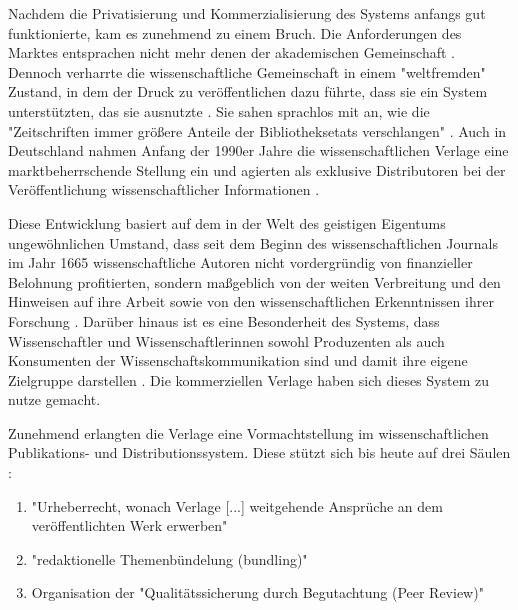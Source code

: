 Nachdem die Privatisierung und Kommerzialisierung des Systems anfangs gut funktionierte, kam es zunehmend zu einem Bruch. Die Anforderungen des Marktes entsprachen nicht mehr denen der akademischen Gemeinschaft \cite{Weiner_2001}. Dennoch verharrte die wissenschaftliche Gemeinschaft in einem "weltfremden" Zustand, in dem der Druck zu veröffentlichen dazu führte, dass sie ein System unterstützten, das sie ausnutzte \cite{Weiner_2001}. Sie sahen sprachlos mit an, wie die "Zeitschriften immer größere Anteile der Bibliotheksetats verschlangen" \cite{Hagner_2015}. Auch in Deutschland nahmen Anfang der 1990er Jahre die wissenschaftlichen Verlage eine marktbeherrschende Stellung ein und agierten als exklusive Distributoren bei der Veröffentlichung wissenschaftlicher Informationen \cite{Schloegl_2005} \cite{Offhaus_2012}.

Diese Entwicklung basiert auf dem in der Welt des geistigen Eigentums ungewöhnlichen Umstand, dass seit dem Beginn des wissenschaftlichen Journals im Jahr 1665 wissenschaftliche Autoren nicht vordergründig von finanzieller Belohnung profitierten, sondern maßgeblich von der weiten Verbreitung und den Hinweisen auf ihre Arbeit sowie von den wissenschaftlichen Erkenntnissen ihrer Forschung \cite{Albert_2006}. Darüber hinaus ist es eine Besonderheit des Systems, dass Wissenschaftler und Wissenschaftlerinnen sowohl Produzenten als auch Konsumenten der Wissenschaftskommunikation sind und damit ihre eigene Zielgruppe darstellen \cite{Hess_2006}. Die kommerziellen Verlage haben sich dieses System zu nutze gemacht.

Zunehmend erlangten die Verlage eine Vormachtstellung im wissenschaftlichen Publikations- und Distributionssystem. Diese stützt sich bis heute auf drei Säulen \cite{Offhaus_2012} \cite[:177]{Bargheer_2006}:
\begin{enumerate}
\item "Urheberrecht, wonach Verlage [...] weitgehende Ansprüche an dem veröffentlichten Werk erwerben"
\item "redaktionelle Themenbündelung (bundling)"
\item Organisation der "Qualitätssicherung durch Begutachtung (Peer Review)"
\end{enumerate}

